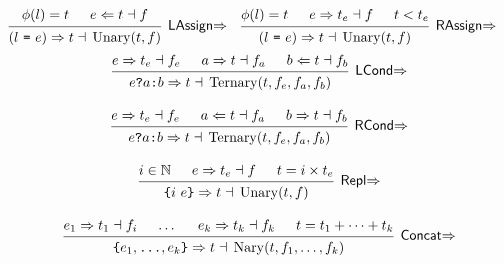 \documentclass{article}
\DeclareMathOperator{\Unary}{Unary}
\DeclareMathOperator{\Ternary}{Ternary}
\DeclareMathOperator{\Nary}{Nary}
\newcommand{\Syn}{\ensuremath{\Rightarrow}}
\newcommand{\Chk}{\ensuremath{\Leftarrow}}
\newcommand{\s}[3]{\ensuremath{#1 \Syn{} #2 \dashv{} #3}}
\renewcommand{\c}[3]{\ensuremath{#1 \Chk{} #2 \dashv{} #3}}
\begin{document}
\begin{align*}
   &
  \begin{prooftree}
    \hypo{\phi(l) = t}
    \hypo{\c{e}{t}{f}}
    \infer2[\textsf{LAssign\Syn}]{\s{(l~\texttt{=}~e)}{t}{\Unary(t, f)}}
  \end{prooftree}
   &
   &
  \begin{prooftree}
    \hypo{\phi(l) = t}
    \hypo{\s{e}{t_e}{f}}
    \hypo{t < t_e}
    \infer3[\textsf{RAssign\Syn}]{\s{(l~\texttt{=}~e)}{t}{\Unary(t, f)}}
  \end{prooftree}
\end{align*}
\begin{gather*}
  \begin{prooftree}
    \hypo{\s{e}{t_e}{f_e}}
    \hypo{\s{a}{t}{f_a}}
    \hypo{\c{b}{t}{f_b}}
    \infer3[\textsf{LCond\Syn}]{\s{e \texttt{?} a \texttt{:} b}{t}%
      {\Ternary(t, f_e, f_a, f_b)}}
  \end{prooftree}
  \\[1em]
  \begin{prooftree}
    \hypo{\s{e}{t_e}{f_e}}
    \hypo{\c{a}{t}{f_a}}
    \hypo{\s{b}{t}{f_b}}
    \infer3[\textsf{RCond\Syn}]{\s{e \texttt{?} a \texttt{:} b}{t}%
      {\Ternary(t, f_e, f_a, f_b)}}
  \end{prooftree}
  \\[1em]
  \begin{prooftree}
    \hypo{i \in \mathbb{N}}
    \hypo{\s{e}{t_e}{f}}
    \hypo{t = i \times t_e}
    \infer3[\textsf{Repl\Syn}]{\s{\texttt{\{}i~e\texttt{\}}}{t}{\Unary(t, f)}}
  \end{prooftree}
  \\[1em]
  \begin{prooftree}
    \hypo{\s{e_1}{t_1}{f_i}}
    \hypo{\dots}
    \hypo{\s{e_k}{t_k}{f_k}}
    \hypo{t = t_1 + \cdots + t_k}
    \infer4[\textsf{Concat\Syn}]
    {\s{\texttt{\{}e_1, \texttt{\dots}, e_k \texttt{\}}}{t}
      {\Nary(t, f_1, \dots, f_k)}}
  \end{prooftree}
\end{gather*}
\end{document}
